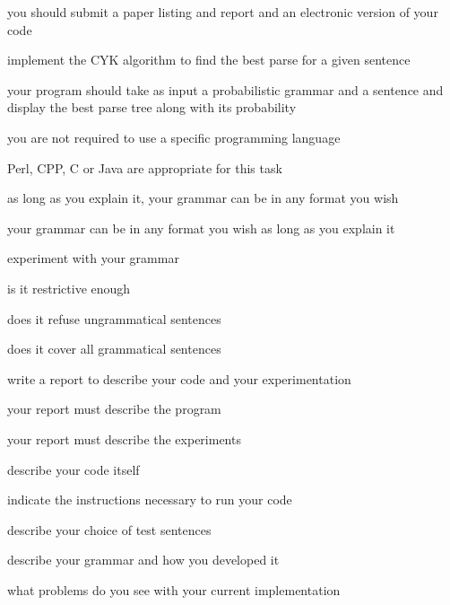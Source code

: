 \scriptsize
you should submit a paper listing and report and an electronic version of your code

\par
implement the CYK algorithm to find the best parse for a given sentence

\par
your program should take as input a probabilistic grammar and a sentence and display the best parse tree along with its probability

\par
you are not required to use a specific programming language

\par
Perl, CPP, C or Java are appropriate for this task

\par
as long as you explain it, your grammar can be in any format you wish

\par
your grammar can be in any format you wish as long as you explain it

\par
experiment with your grammar

\par
is it restrictive enough

\par
does it refuse ungrammatical sentences

\par
does it cover all grammatical sentences

\par
write a report to describe your code and your experimentation

\par
your report must describe the program

\par
your report must describe the experiments

\par
describe your code itself

\par
indicate the instructions necessary to run your code

\par
describe your choice of test sentences

\par
describe your grammar and how you developed it

\par
what problems do you see with your current implementation

